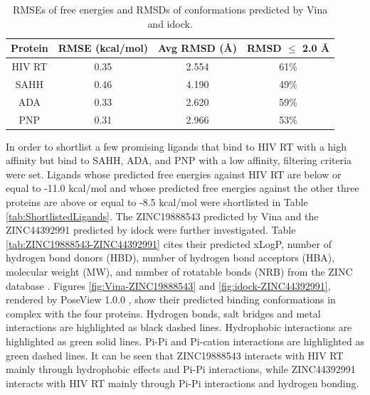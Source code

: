 \documentclass[10pt, conference, compsocconf]{IEEEtran}
\begin{document}
\begin{table}
\centering
\begin{tabular*}
{\linewidth}
{@{\extracolsep{\fill}}cccc}
\toprule
Protein & RMSE (kcal/mol) & Avg RMSD (\AA) & RMSD $\leq$ 2.0 \AA\\
\midrule
HIV RT & 0.35 & 2.554 & 61\%\\
SAHH   & 0.46 & 4.190 & 49\%\\
ADA    & 0.33 & 2.620 & 59\%\\
PNP    & 0.31 & 2.966 & 53\%\\
\bottomrule
\end{tabular*}
\caption{RMSEs of free energies and RMSDs of conformations predicted by Vina and idock.}
\label{tab:RMSEAndRMSD}
\end{table}

In order to shortlist a few promising ligands that bind to HIV RT with a high affinity but bind to SAHH, ADA, and PNP with a low affinity, filtering criteria were set. Ligands whose predicted free energies against HIV RT are below or equal to -11.0 kcal/mol and whose predicted free energies against the other three proteins are above or equal to -8.5 kcal/mol were shortlisted in Table \ref{tab:ShortlistedLigands}. The ZINC19888543 predicted by Vina and the ZINC44392991 predicted by idock were further investigated. Table \ref{tab:ZINC19888543-ZINC44392991} cites their predicted xLogP, number of hydrogen bond donors (HBD), number of hydrogen bond acceptors (HBA), molecular weight (MW), and number of rotatable bonds (NRB) from the ZINC database \cite{532}. Figures \ref{fig:Vina-ZINC19888543} and \ref{fig:idock-ZINC44392991}, rendered by PoseView 1.0.0 \cite{748}, show their predicted binding conformations in complex with the four proteins. Hydrogen bonds, salt bridges and metal interactions are highlighted as black dashed lines. Hydrophobic interactions are highlighted as green solid lines. Pi-Pi and Pi-cation interactions are highlighted as green dashed lines. It can be seen that ZINC19888543 interacts with HIV RT mainly through hydrophobic effects and Pi-Pi interactions, while ZINC44392991 interacts with HIV RT mainly through Pi-Pi interactions and hydrogen bonding.
\end{document}
